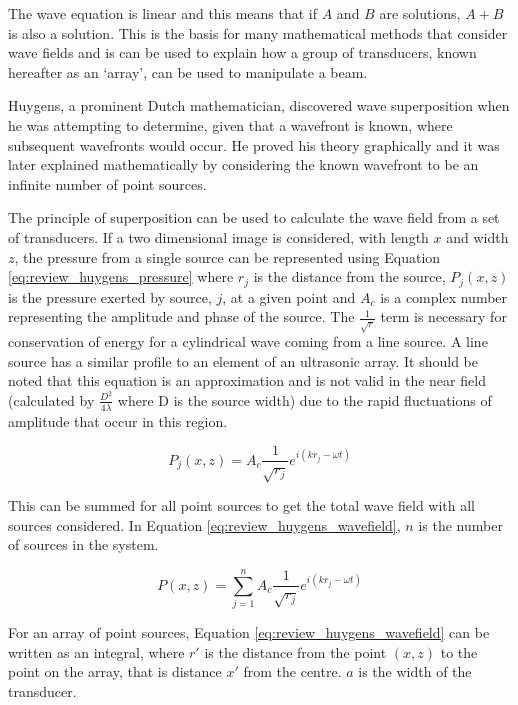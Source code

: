 The wave equation is linear and this means that if $A$ and $B$ are solutions, $A+B$ is also a solution\cite{freegarde_introduction_2012}. This is the basis for many mathematical methods that consider wave fields and is can be used to explain how a group of transducers, known hereafter as an `array', can be used to manipulate a beam.

Huygens, a prominent Dutch mathematician, discovered wave superposition when he was attempting to determine, given that a wavefront is known, where subsequent wavefronts would occur. He proved his theory graphically and it was later explained mathematically by considering the known wavefront to be an infinite number of point sources\cite{baker_mathematical_2003}.

The principle of superposition can be used to calculate the wave field from a set of transducers. If a two dimensional image is considered, with length $x$ and width $z$, the pressure from a single source can be represented using Equation \ref{eq:review_huygens_pressure} where $r_j$ is the distance from the source, $P_j(x,z)$ is the pressure exerted by source, $j$, at a given point and $A_c$ is a complex number representing the amplitude and phase of the source\cite{drinkwater_ultrasonic_2006}. The $\frac{1}{\sqrt{r}}$ term is necessary for conservation of energy for a cylindrical wave coming from a line source. A line source has a similar profile to an element of an ultrasonic array. It should be noted that this equation is an approximation and is not valid in the near field (calculated by $\frac{D^2}{4\lambda}$ where D is the source width) due to the rapid fluctuations of amplitude that occur in this region. 

\begin{equation} \label{eq:review_huygens_pressure}
P_j(x,z) = A_c \frac{1}{\sqrt{r_j}} e^{i(kr_j - \omega t)}
\end{equation}

This can be summed for all point sources to get the total wave field with all sources considered. In Equation \ref{eq:review_huygens_wavefield}, $n$ is the number of sources in the system. 

\begin{equation} \label{eq:review_huygens_wavefield}
P(x,z) = \sum_{j=1}^{n} A_c \frac{1}{\sqrt{r_j}} e^{i(kr_j - \omega t)}
\end{equation}

For an array of point sources, Equation \ref{eq:review_huygens_wavefield} can be written as an integral, where $r'$ is the distance from the point $(x,z)$ to the point on the array, that is distance $x'$ from the centre. $a$ is the width of the transducer.

